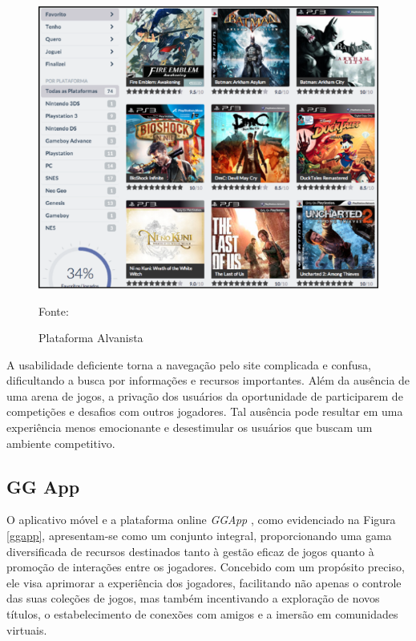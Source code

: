 \begin{figure}[H]
	\centering
	\includegraphics[scale=0.6]{./imagens/introducao/alvanista.png}
	\caption{Plataforma Alvanista}
	\label{Alvanista}
	Fonte: \cite{alvanista}
\end{figure}

A usabilidade deficiente torna a navegação pelo site complicada e confusa, dificultando a busca por informações e recursos importantes. Além da ausência de uma arena de jogos, a privação dos usuários da oportunidade de participarem de competições e desafios com outros jogadores. Tal ausência pode resultar em uma experiência menos emocionante e desestimular os usuários que buscam um ambiente competitivo.

\subsection{GG App}

O aplicativo móvel e a plataforma online \textit{\gls{GGApp}} \cite{ggapp}, como evidenciado na Figura \ref{ggapp}, apresentam-se como um conjunto integral, proporcionando uma gama diversificada de recursos destinados tanto à gestão eficaz de jogos quanto à promoção de interações entre os jogadores. Concebido com um propósito preciso, ele visa aprimorar a experiência dos jogadores, facilitando não apenas o controle das suas coleções de jogos, mas também incentivando a exploração de novos títulos, o estabelecimento de conexões com amigos e a imersão em comunidades virtuais.

